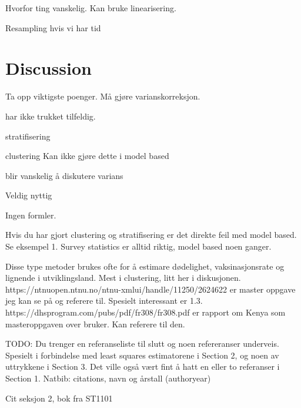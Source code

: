 \documentclass{article}
\begin{document}
Hvorfor ting vanskelig.
Kan bruke linearisering.

Resampling hvis vi har tid

\section{Discussion}
Ta opp viktigste poenger.
Må gjøre varianskorreksjon.

har ikke trukket tilfeldig.

stratifisering

clustering
  Kan ikke gjøre dette i model based

blir vanskelig å diskutere varians

Veldig nyttig

Ingen formler.

Hvis du har gjort clustering og stratifisering er det direkte feil med model
based. Se eksempel 1. Survey statistics er alltid riktig, model based noen ganger.

Disse type metoder brukes ofte for å estimare dødelighet, vaksinasjonsrate og
lignende i utviklingsland. Mest i clustering, litt her i diskusjonen.
https://ntnuopen.ntnu.no/ntnu-xmlui/handle/11250/2624622 er master oppgave jeg
kan se på og referere til. Spesielt interessant er 1.3.
https://dhsprogram.com/pubs/pdf/fr308/fr308.pdf er rapport om Kenya som
masteroppgaven over bruker. Kan referere til den.

TODO: Du trenger en referanseliste til slutt og noen refereranser underveis. Spesielt i forbindelse med least squares estimatorene i Section 2, og noen av uttrykkene i Section 3. Det ville også vært fint å hatt en eller to referanser i Section 1.
Natbib: citations, navn og årstall (authoryear)

Cit seksjon 2, bok fra ST1101

\medskip


\end{document}
